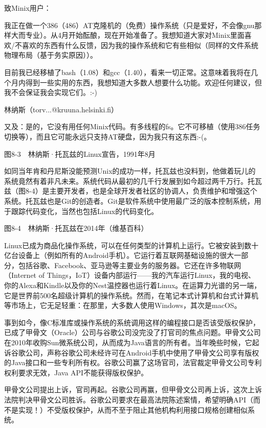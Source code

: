 \documentclass[a4paper,12pt,UTF8,twoside]{ctexbook}
\begin{document}
致Minix用户：

我正在做一个386（486）AT克隆机的（免费）操作系统（只是爱好，不会像gnu那样大而专业）。从4月开始酝酿，现在开始准备了。我想知道大家对Minix里面喜欢/不喜欢的东西有什么反馈，因为我的操作系统和它有些相似（同样的文件系统物理布局（基于务实原因））。

目前我已经移植了bash（1.08）和gcc（1.40），看来一切正常。这意味着我将在几个月内得到一些实用的东西，我想知道大多数人想要什么功能。欢迎任何建议，但我不会保证我会实现它们。:-)

林纳斯（torv...@kruuna.helsinki.fi）

又及：是的，它没有用任何Minix代码。有多线程的fs。它不可移植（使用386任务切换等），而且它可能永远只支持AT硬盘，因为我只有这东西:-(。



图8-3　林纳斯·托瓦兹的Linux宣告，1991年8月

如同当年肯和丹尼斯没能预测Unix的成功一样，托瓦兹也没料到，他做着玩儿的系统竟然有着非凡未来。系统代码从最初的几千行发展到如今超过两千万行。托瓦兹（图8-4）是主要开发者，也是全球开发者社区的协调人，负责维护和增强这个系统。托瓦兹也是Git的创造者。Git是软件系统中使用最广泛的版本控制系统，用于跟踪代码变化，当然也包括Linux的代码变化。



图8-4　林纳斯·托瓦兹在2014年（维基百科）

Linux已成为商品化操作系统，可以在任何类型的计算机上运行。它被安装到数十亿台设备上（例如所有的Android手机）。它运行着互联网基础设施的很大一部分，包括谷歌、Facebook、亚马逊等主要业务的服务器。它还在许多物联网（Internet of Things，IoT）设备内部运行——我的汽车运行Linux，我的电视、你的Alexa和Kindle以及你的Nest温控器也运行着Linux。在运算力光谱的另一端，它是世界前500名超级计算机的操作系统。然而，在笔记本式计算机和台式计算机等市场上，它无足轻重：在那里，大多数人使用Windows，其次是macOS。

事到如今，像C标准库或操作系统的系统调用这样的编程接口是否该受版权保护，已成了甲骨文（Oracle）公司与谷歌公司没完没了打官司的焦点问题。甲骨文公司在2010年收购Sun微系统公司，从而成为Java语言的所有者。当年晚些时候，它起诉谷歌公司，声称谷歌公司未经许可在Android手机中使用了甲骨文公司享有版权的Java接口和一些专利所有权。谷歌公司赢了这场官司，法官裁定甲骨文公司专利权利要求无效，Java API不能获得版权保护。

甲骨文公司提出上诉，官司再起。谷歌公司再赢，但甲骨文公司再上诉，这次上诉法院判决甲骨文公司胜诉。谷歌公司要求在最高法院陈述案情，希望明确API（而不是实现！）不受版权保护，从而不至于阻止其他机构利用接口规格创建相似系统。
\end{document}
